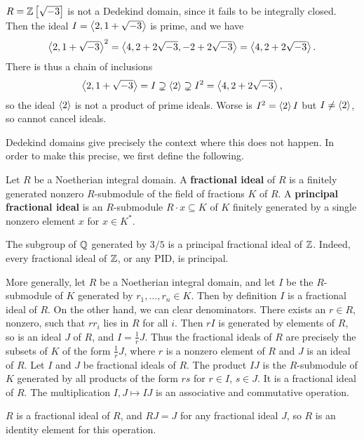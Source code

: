 \begin{example*}
$ R = \mathbb{Z}\left[ \sqrt{-3} \right] $ is not a Dedekind domain, since it fails to be integrally closed. Then the ideal $ I = \left\langle 2, 1 + \sqrt{-3} \right\rangle $ is prime, and we have
$$ \left\langle 2, 1 + \sqrt{-3} \right\rangle^2 = \left\langle 4, 2 + 2\sqrt{-3}, -2 + 2\sqrt{-3} \right\rangle = \left\langle 4, 2 + 2\sqrt{-3} \right\rangle. $$
There is thus a chain of inclusions
$$ \left\langle 2, 1 + \sqrt{-3} \right\rangle = I \supsetneq \left\langle 2 \right\rangle \supsetneq I^2 = \left\langle 4, 2 + 2\sqrt{-3} \right\rangle, $$
so the ideal $ \left\langle 2 \right\rangle $ is not a product of prime ideals. Worse is $ I^2 = \left\langle 2 \right\rangle I $ but $ I \ne \left\langle 2 \right\rangle $, so cannot cancel ideals.
\end{example*}

Dedekind domains give precisely the context where this does not happen. In order to make this precise, we first define the following.

\begin{definition}
Let $ R $ be a Noetherian integral domain. A \textbf{fractional ideal} of $ R $ is a finitely generated nonzero $ R $-submodule of the field of fractions $ K $ of $ R $. A \textbf{principal fractional ideal} is an $ R $-submodule $ R \cdot x \subseteq K $ of $ K $ finitely generated by a single nonzero element $ x $ for $ x \in K^* $.
\end{definition}

\begin{example*}
The subgroup of $ \mathbb{Q} $ generated by $ 3 / 5 $ is a principal fractional ideal of $ \mathbb{Z} $. Indeed, every fractional ideal of $ \mathbb{Z} $, or any PID, is principal.
\end{example*}

More generally, let $ R $ be a Noetherian integral domain, and let $ I $ be the $ R $-submodule of $ K $ generated by $ r_1, \dots, r_n \in K $. Then by definition $ I $ is a fractional ideal of $ R $. On the other hand, we can clear denominators. There exists an $ r \in R $, nonzero, such that $ rr_i $ lies in $ R $ for all $ i $. Then $ rI $ is generated by elements of $ R $, so is an ideal $ J $ of $ R $, and $ I = \tfrac{1}{r}J $. Thus the fractional ideals of $ R $ are precisely the subsets of $ K $ of the form $ \tfrac{1}{r}J $, where $ r $ is a nonzero element of $ R $ and $ J $ is an ideal of $ R $. Let $ I $ and $ J $ be fractional ideals of $ R $. The product $ IJ $ is the $ R $-submodule of $ K $ generated by all products of the form $ rs $ for $ r \in I $, $ s \in J $. It is a fractional ideal of $ R $. The multiplication $ I, J \mapsto IJ $ is an associative and commutative operation.

\begin{note*}
$ R $ is a fractional ideal of $ R $, and $ RJ = J $ for any fractional ideal $ J $, so $ R $ is an identity element for this operation.
\end{note*}

